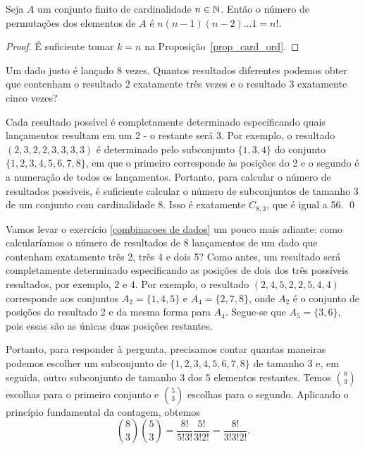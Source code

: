 \begin{corollary}
Seja $A$ um conjunto finito de cardinalidade $n \in \mathbb{N}$. Então o número de permutações dos elementos de $A$ é $n(n-1)(n-2)\dots1=n!$.
    \label{cor_perm}
\end{corollary}

\begin{proof}
É suficiente tomar $k=n$ na Proposição~\ref{prop_card_ord}.
\end{proof}

\begin{exercise}
\label{combinacoes de dados}
Um dado justo é lançado 8 vezes. Quantos resultados diferentes podemos obter que contenham o resultado 2 exatamente três vezes e o resultado 3 exatamente cinco vezes?
\end{exercise}

\begin{solution}
Cada resultado possível é completamente determinado especificando quais lançamentos resultam em um 2 - o restante será 3. Por exemplo, o resultado $(2,3,2,2,3,3,3,3)$ é determinado pelo subconjunto $\{1,3,4\}$ do conjunto $\{1,2,3,4,5,6,7,8\}$, em que o primeiro corresponde às posições do 2 e o segundo é a numeração de todos os lançamentos. Portanto, para calcular o número de resultados possíveis, é suficiente calcular o número de subconjuntos de tamanho 3 de um conjunto com cardinalidade 8. Isso é exatamente $C_{8,3}$, que é igual a 56.
\qed
\end{solution}

\begin{example}
Vamos levar o exercício \ref{combinacoes de dados} um pouco mais adiante: como calcularíamos o número de resultados de 8 lançamentos de um dado que contenham exatamente três 2, três 4 e dois 5? Como antes, um resultado será completamente determinado especificando as posições de dois dos três possíveis resultados, por exemplo, 2 e 4. Por exemplo, o resultado $(2,4,5,2,2,5,4,4)$ corresponde aos conjuntos $A_2 = \{1,4,5\}$ e $A_4 = \{2,7,8\}$, onde $A_2$ é o conjunto de posições do resultado 2 e da mesma forma para $A_4$. Segue-se que $A_5 = \{3,6\}$, pois essas são as únicas duas posições restantes.

Portanto, para responder à pergunta, precisamos contar quantas maneiras podemos escolher um subconjunto de $\{1,2,3,4,5,6,7,8\}$ de tamanho 3 e, em seguida, outro subconjunto de tamanho 3 dos 5 elementos restantes. Temos $\binom{8}{3}$ escolhas para o primeiro conjunto e $\binom{5}{3}$ escolhas para o segundo. Aplicando o princípio fundamental da contagem, obtemos
\begin{equation}
\binom{8}{3}\binom{5}{3} = \frac{8!}{5!3!}\frac{5!}{3!2!} = \frac{8!}{3!3!2!}.
\end{equation}
\end{example}

